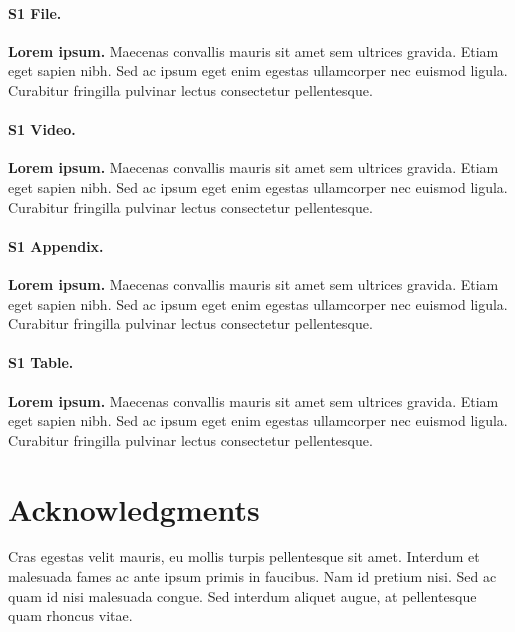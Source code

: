 \documentclass[10pt,letterpaper]{article}
\begin{document}
\paragraph*{S1 File.}
\label{S1_File}
{\bf Lorem ipsum.}  Maecenas convallis mauris sit amet sem ultrices gravida. Etiam eget sapien nibh. Sed ac ipsum eget enim egestas ullamcorper nec euismod ligula. Curabitur fringilla pulvinar lectus consectetur pellentesque.

\paragraph*{S1 Video.}
\label{S1_Video}
{\bf Lorem ipsum.}  Maecenas convallis mauris sit amet sem ultrices gravida. Etiam eget sapien nibh. Sed ac ipsum eget enim egestas ullamcorper nec euismod ligula. Curabitur fringilla pulvinar lectus consectetur pellentesque.

\paragraph*{S1 Appendix.}
\label{S1_Appendix}
{\bf Lorem ipsum.} Maecenas convallis mauris sit amet sem ultrices gravida. Etiam eget sapien nibh. Sed ac ipsum eget enim egestas ullamcorper nec euismod ligula. Curabitur fringilla pulvinar lectus consectetur pellentesque.

\paragraph*{S1 Table.}
\label{S1_Table}
{\bf Lorem ipsum.} Maecenas convallis mauris sit amet sem ultrices gravida. Etiam eget sapien nibh. Sed ac ipsum eget enim egestas ullamcorper nec euismod ligula. Curabitur fringilla pulvinar lectus consectetur pellentesque.

\section*{Acknowledgments}
Cras egestas velit mauris, eu mollis turpis pellentesque sit amet. Interdum et malesuada fames ac ante ipsum primis in faucibus. Nam id pretium nisi. Sed ac quam id nisi malesuada congue. Sed interdum aliquet augue, at pellentesque quam rhoncus vitae.

\nolinenumbers

%
%
% 

\end{document}
